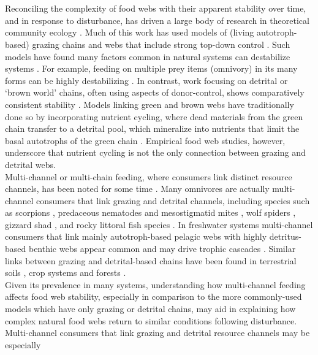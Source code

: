 \documentclass[12pt,a4paper,oneside]{article}
\begin{document}
\pagebreak
{}\\
\\
\indent Reconciling the complexity of food webs with their apparent stability over time, and in response to disturbance, has driven a large body of research in theoretical community ecology \citep{Pimm:1982,Polis:1998}. Much of this work has used models of (living autotroph-based) grazing chains and webs \citep[the `green world,'][]{Hairston:1960kx} that include strong top-down control \citep{Pimm:1982,McCann:1997}. Such models have found many factors common in natural systems can destabilize systems \citep{Holt:1994,Tanabe:2005jc}. For example, feeding on multiple prey items (omnivory) in its many forms can be highly destabilizing \citep{Holt:1994}. In contrast, work focusing on detrital or `brown world' chains, often using aspects of donor-control, shows comparatively consistent stability \citep{Moore:2004,Blanchard:2011}. Models linking green and brown webs have traditionally done so by incorporating nutrient cycling, where dead materials from the green chain transfer to a detrital pool, which  mineralize into nutrients that limit the basal autotrophs of the green chain \citep{DeAngelis:1992, DeAngelis:1989}. Empirical food web studies, however, underscore that nutrient cycling is not the only connection between grazing and detrital webs.
\\
\indent Multi-channel \citep{Odum:1969,Moore:1988,Polis:1996} or multi-chain \citep{Vadeboncoeur:2005} feeding, where consumers link distinct resource channels, has been noted for some time \citep{Odum:1984}. Many omnivores are actually
multi-channel consumers that link grazing and
detrital channels, including species such as scorpions
\citep{Polis:1987}, predaceous nematodes and mesostigmatid mites \citep{Moore:1988}, wolf spiders \citep{Fagan:1997}, gizzard shad
\citep{Nowlin:2008}, and rocky littoral fish species
\citep{Pinnegar:2000}. In freshwater systems multi-channel consumers
that link mainly autotroph-based pelagic webs with highly
detritus-based benthic webs appear common and may drive trophic cascades
\citep{Vadeboncoeur:2002,Vadeboncoeur:2005}. Similar links between grazing and detrital-based chains
have been found in terrestrial soils \citep{Hunt:1987nw}, crop systems \citep{Settle:1996} and
forests \citep{Miyashita:2003}.
\\
\indent Given its prevalence in many systems, understanding how multi-channel feeding affects food web stability, especially in comparison to the more commonly-used models which have only grazing or detrital chains, may aid in explaining how complex natural food webs return to similar conditions following disturbance. Multi-channel consumers that link grazing and detrital resource channels may be especially
\end{document}
